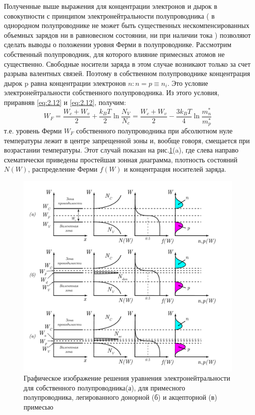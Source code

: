 		Полученные выше выражения для концентрации электронов и дырок в совокупности с принципом электронейтральности
		полупроводника ( в однородном полупроводнике не может быть существенных нескомпенсированных объемных зарядов ни в
		равновесном состоянии, ни при наличии тока ) позволяют сделать выводы о положении уровня Ферми в полупроводнике.
		Рассмотрим собственный полупроводник, для которого влияние примесных атомов не существенно. Свободные носители заряда в
		этом случае возникают только за счет разрыва валентных связей. Поэтому в собственном полупроводнике концентрация дырок p
		равна концентрации электронов $ n: n = p \equiv n_i$. Это условие электронейтральности собственного полупроводника. Из этого
		условия, приравняв \eqref{eq:2.12} и \eqref{eq:2.12}, получим:
		\begin{equation}
		W_{F}=\frac{W_{c}+W_{v}}{2}+\frac{k_{B} T}{2} \ln \frac{N_{V}}{N_{c}}=\frac{W_{c}+W_{v}}{2}-\frac{3 k_{B} T}{4} \ln \frac{m_{n}^{*}}{m_{p}^{*}}
		\label{eq:2.14}
		\end{equation}
		т.е. уровень Ферми $W_F$ собственного полупроводника при абсолютном нуле температуры лежит в центре запрещенной зоны и,
		вообще говоря, смещается при возрастании температуры. Этот случай показан на рис.\ref{fig:2.1}(a), где слева направо схематически
		приведены простейшая зонная диаграмма, плотность состояний $N(W)$, распределение Ферми $f (W)$ и концентрация носителей
		заряда.
		
		
		\begin{figure}[h!]
			\includegraphics[width = \linewidth]{img/22}
			\caption{Графическое изображение решения уравнения электронейтральности для собственного полупроводника(а), для примесного полупроводника, легированного донорной (б) и акцепторной (в) примесью}
			\label{fig:2.1}
		\end{figure}
		
